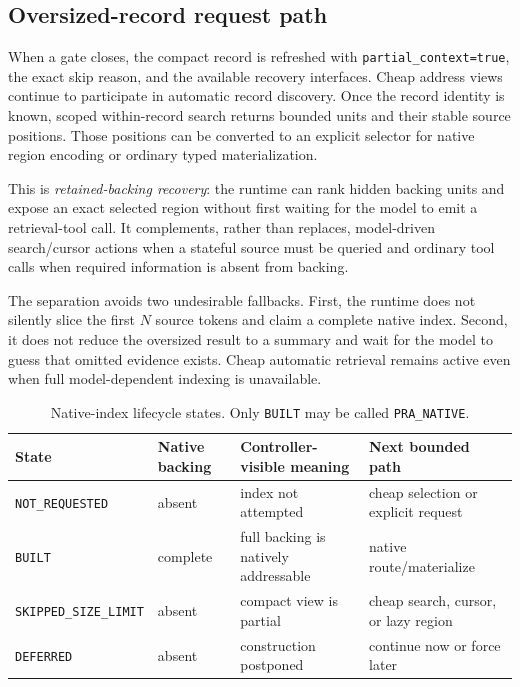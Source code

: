 \documentclass[11pt]{article}
\begin{document}
\subsection{Oversized-record request path}

When a gate closes, the compact record is refreshed with
\texttt{partial\_context=true}, the exact skip reason, and the available
recovery interfaces. Cheap address views continue to participate in automatic
record discovery. Once the record identity is known, scoped within-record
search returns bounded units and their stable source positions. Those positions
can be converted to an explicit selector for native region encoding or ordinary
typed materialization.

This is \emph{retained-backing recovery}: the runtime can rank hidden backing
units and expose an exact selected region without first waiting for the model
to emit a retrieval-tool call. It complements, rather than replaces,
model-driven search/cursor actions when a stateful source must be queried and
ordinary tool calls when required information is absent from backing.

The separation avoids two undesirable fallbacks. First, the runtime does not
silently slice the first $N$ source tokens and claim a complete native index.
Second, it does not reduce the oversized result to a summary and wait for the
model to guess that omitted evidence exists. Cheap automatic retrieval remains
active even when full model-dependent indexing is unavailable.

\begin{table}[t]
\centering
\small
\begin{tabularx}{\linewidth}{@{}lXXX@{}}
\toprule
State & Native backing & Controller-visible meaning & Next bounded path\\
\midrule
\texttt{NOT\_REQUESTED} & absent & index not attempted & cheap selection or explicit request\\
\texttt{BUILT} & complete & full backing is natively addressable & native route/materialize\\
\texttt{SKIPPED\_SIZE\_LIMIT} & absent & compact view is partial & cheap search, cursor, or lazy region\\
\texttt{DEFERRED} & absent & construction postponed & continue now or force later\\
\bottomrule
\end{tabularx}
\caption{Native-index lifecycle states. Only \texttt{BUILT} may be called
\texttt{PRA\_NATIVE}.}
\label{tab:index-states}
\end{table}
\end{document}
